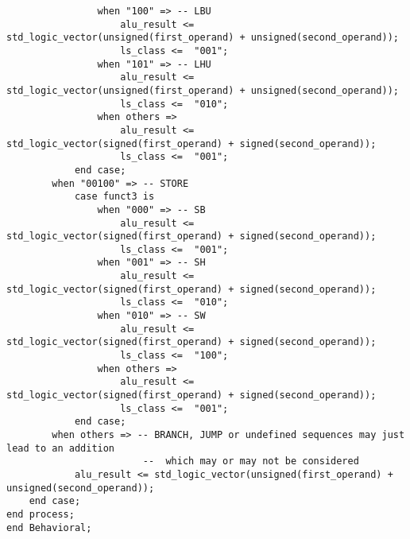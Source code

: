 \begin{code}
\begin{verbatim}
                when "100" => -- LBU
                    alu_result <= std_logic_vector(unsigned(first_operand) + unsigned(second_operand));
                    ls_class <=  "001";
                when "101" => -- LHU
                    alu_result <= std_logic_vector(unsigned(first_operand) + unsigned(second_operand));
                    ls_class <=  "010";
                when others =>
                    alu_result <= std_logic_vector(signed(first_operand) + signed(second_operand));
                    ls_class <=  "001";
            end case;
        when "00100" => -- STORE
            case funct3 is
                when "000" => -- SB
                    alu_result <= std_logic_vector(signed(first_operand) + signed(second_operand));
                    ls_class <=  "001";
                when "001" => -- SH
                    alu_result <= std_logic_vector(signed(first_operand) + signed(second_operand));
                    ls_class <=  "010";
                when "010" => -- SW
                    alu_result <= std_logic_vector(signed(first_operand) + signed(second_operand));
                    ls_class <=  "100";
                when others =>
                    alu_result <= std_logic_vector(signed(first_operand) + signed(second_operand));
                    ls_class <=  "001";
            end case;
        when others => -- BRANCH, JUMP or undefined sequences may just lead to an addition 
                        --  which may or may not be considered
            alu_result <= std_logic_vector(unsigned(first_operand) + unsigned(second_operand));
    end case;
end process;
end Behavioral;
\end{verbatim}
\end{code}

